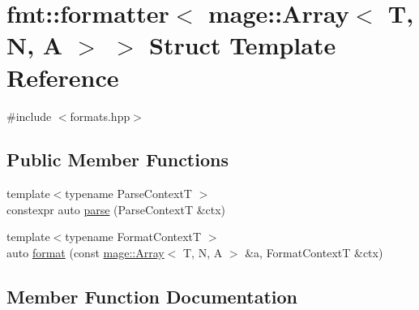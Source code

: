 \hypertarget{structfmt_1_1formatter_3_01mage_1_1_array_3_01_t_00_01_n_00_01_a_01_4_01_4}{}\section{fmt\+:\+:formatter$<$ mage\+:\+:Array$<$ T, N, A $>$ $>$ Struct Template Reference}
\label{structfmt_1_1formatter_3_01mage_1_1_array_3_01_t_00_01_n_00_01_a_01_4_01_4}


{\ttfamily \#include $<$formats.\+hpp$>$}

\subsection*{Public Member Functions}
\begin{DoxyCompactItemize}
\item 
{\footnotesize template$<$typename Parse\+ContextT $>$ }\\constexpr auto \mbox{\hyperlink{structfmt_1_1formatter_3_01mage_1_1_array_3_01_t_00_01_n_00_01_a_01_4_01_4_a39b2d7f0cc3c82228f5ad09dedee4a43}{parse}} (Parse\+ContextT \&ctx)
\item 
{\footnotesize template$<$typename Format\+ContextT $>$ }\\auto \mbox{\hyperlink{structfmt_1_1formatter_3_01mage_1_1_array_3_01_t_00_01_n_00_01_a_01_4_01_4_ada7fd2312149bfa8dcab54f57bd1c1fa}{format}} (const \mbox{\hyperlink{structmage_1_1_array}{mage\+::\+Array}}$<$ T, N, A $>$ \&a, Format\+ContextT \&ctx)
\end{DoxyCompactItemize}


\subsection{Member Function Documentation}
\mbox{\label{structfmt_1_1formatter_3_01mage_1_1_array_3_01_t_00_01_n_00_01_a_01_4_01_4_ada7fd2312149bfa8dcab54f57bd1c1fa}} 
